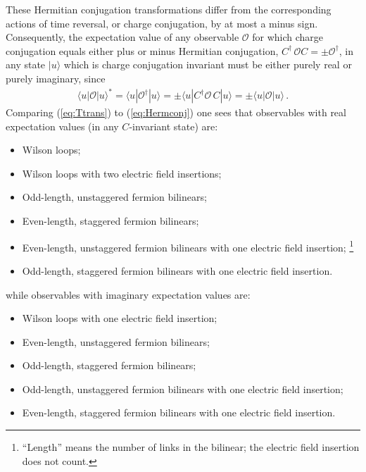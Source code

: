 \documentclass [12pt]{article}
\begin{document}
These Hermitian conjugation transformations differ from the corresponding
actions of time reversal, or charge conjugation, by at most a minus sign.
Consequently, the expectation value of any observable $\mathcal O$ for which
charge conjugation equals either plus or minus Hermitian conjugation,
$
    C^\dagger \, \mathcal O C = \pm \mathcal O^\dagger
$,
in any state $|u\rangle$ which is charge conjugation invariant
must be either purely real or purely imaginary, since
\begin{align}
    \langle u | \mathcal O |u \rangle^*
    =
    \langle u | \mathcal O^\dagger |u \rangle
    =
    \pm \langle u | C^\dagger \mathcal O \, C |u \rangle
    =
    \pm \langle u | \mathcal O |u \rangle \,.
\label{eq:Creality}
\end{align}
Comparing (\ref{eq:Ttrans}) to (\ref{eq:Hermconj}) one sees that
observables with real expectation values (in any $C$-invariant state)
are:
\begin{itemize}\advance\itemsep -6pt
\item
    Wilson loops;
\item
    Wilson loops with two electric field insertions;
\item
    Odd-length, unstaggered fermion bilinears;
\item
    Even-length, staggered fermion bilinears;
\item
    Even-length, unstaggered fermion bilinears with one electric field insertion;%
    \footnote
	{%
	``Length'' means the number of links in the bilinear;
	the electric field insertion does not count.
	}
\item
    Odd-length, staggered fermion bilinears with one electric field insertion.
\end{itemize}
while observables with imaginary expectation values are:
\begin{itemize}\advance\itemsep -6pt
\item
    Wilson loops with one electric field insertion;
\item
    Even-length, unstaggered fermion bilinears;
\item
    Odd-length, staggered fermion bilinears;
\item
    Odd-length, unstaggered fermion bilinears with one electric field insertion;
\item
    Even-length, staggered fermion bilinears with one electric field insertion.
\end{itemize}
\end{document}

